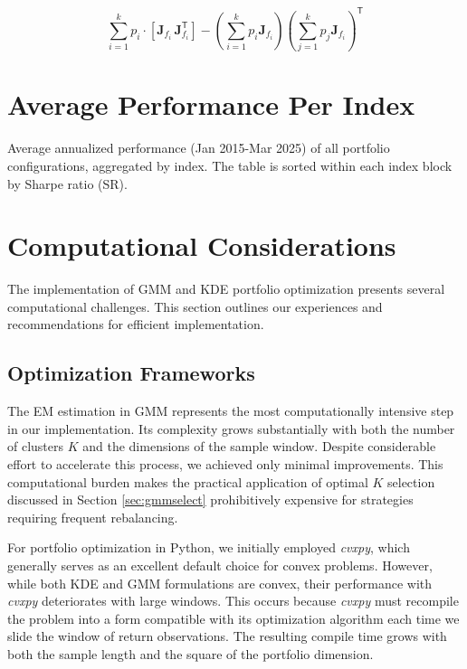 $$\sum_{i=1}^{k}p_i\cdot\left[\mathbf{J}_{f_i}^{}\,\mathbf{J}_{f_i}^{\mathsf{T}}\right]-\left(\sum_{i=1}^{k}p_i\mathbf{J}_{f_i}\right)\left(\sum_{j=1}^{k}p_j\mathbf{J}_{f_i}\right)^{\mathsf{T}}$$

\newpage
\section{Average Performance Per Index}
\label{app:avgperf}

\begin{table}[H]
  \centering
  \makebox[\textwidth][c]{}
  \caption[Per index performance]{Average annualized performance (Jan 2015-Mar 2025) of all portfolio configurations, aggregated by index. The table is sorted within each index block by Sharpe ratio (SR).}
  \label{tab:app:avgperf:combined}
\end{table}


\newpage
\section{Computational Considerations}
\label{app:compute}
The implementation of GMM and KDE portfolio optimization presents several computational challenges. This section outlines our experiences and recommendations for efficient implementation.

\subsection{Optimization Frameworks}
The EM estimation in GMM represents the most computationally intensive step in our implementation. Its complexity grows substantially with both the number of clusters $K$ and the dimensions of the sample window. Despite considerable effort to accelerate this process, we achieved only minimal improvements. This computational burden makes the practical application of optimal $K$ selection discussed in Section \ref{sec:gmmselect} prohibitively expensive for strategies requiring frequent rebalancing.

For portfolio optimization in Python, we initially employed \textit{cvxpy}, which generally serves as an excellent default choice for convex problems. However, while both KDE and GMM formulations are convex, their performance with \textit{cvxpy} deteriorates with large windows. This occurs because \textit{cvxpy} must recompile the problem into a form compatible with its optimization algorithm each time we slide the window of return observations. The resulting compile time grows with both the sample length and the square of the portfolio dimension.

